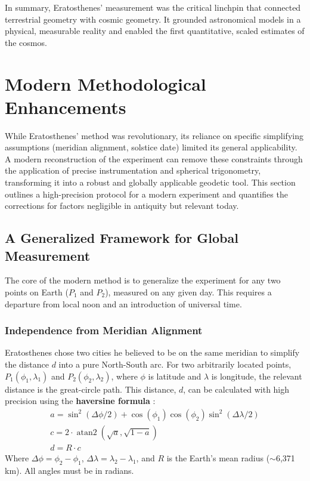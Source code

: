 \documentclass[11pt]{article}
\DeclareMathOperator{\atanS}{atan2}
\begin{document}
In summary, Eratosthenes' measurement was the critical linchpin that connected terrestrial geometry with cosmic geometry. It grounded astronomical models in a physical, measurable reality and enabled the first quantitative, scaled estimates of the cosmos.

\section{Modern Methodological Enhancements}

While Eratosthenes’ method was revolutionary, its reliance on specific simplifying assumptions (meridian alignment, solstice date) limited its general applicability. A modern reconstruction of the experiment can remove these constraints through the application of precise instrumentation and spherical trigonometry, transforming it into a robust and globally applicable geodetic tool. This section outlines a high-precision protocol for a modern experiment and quantifies the corrections for factors negligible in antiquity but relevant today.

\subsection{A Generalized Framework for Global Measurement}

The core of the modern method is to generalize the experiment for any two points on Earth ($P_1$ and $P_2$), measured on any given day. This requires a departure from local noon and an introduction of universal time.

\subsubsection{Independence from Meridian Alignment}
Eratosthenes chose two cities he believed to be on the same meridian to simplify the distance $d$ into a pure North-South arc. For two arbitrarily located points, $P_1(\phi_1, \lambda_1)$ and $P_2(\phi_2, \lambda_2)$, where $\phi$ is latitude and $\lambda$ is longitude, the relevant distance is the great-circle path. This distance, $d$, can be calculated with high precision using the \textbf{haversine formula} \cite{Sinnott1984}:
\begin{gather}
    a = \sin^2(\Delta\phi/2) + \cos(\phi_1)\cos(\phi_2)\sin^2(\Delta\lambda/2) \label{eq:haversine_a} \\
    c = 2 \cdot \atanS(\sqrt{a}, \sqrt{1-a}) \label{eq:haversine_c} \\
    d = R \cdot c 
    \label{eq:haversine_d}
\end{gather}
Where $\Delta\phi = \phi_2 - \phi_1$, $\Delta\lambda = \lambda_2 - \lambda_1$, and $R$ is the Earth's mean radius ($\sim$6,371 km). All angles must be in radians.
\end{document}
